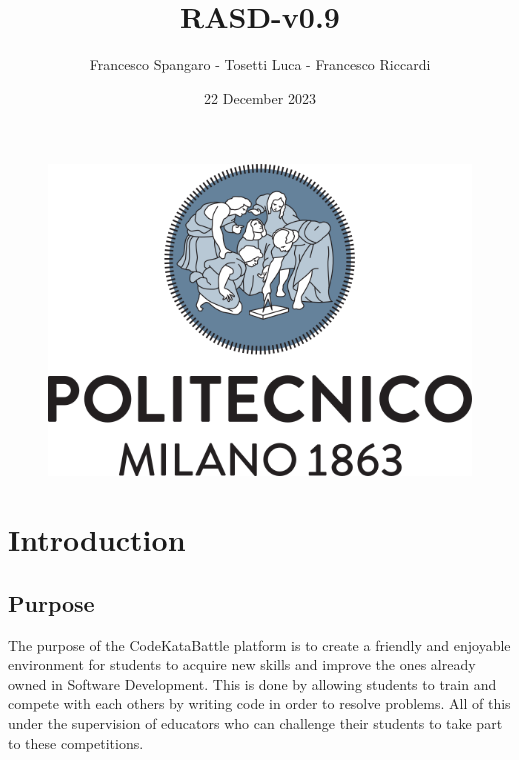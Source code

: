 \documentclass{article}
\title{RASD-v0.9}
\author{Francesco Spangaro - Tosetti Luca - Francesco Riccardi}
\date{22 December 2023}
\begin{document}
\maketitle

\begin{figure}[h]
    \centering
    \includegraphics[scale=0.5]{politecnico-di-milano-logo.png}
\end{figure}



\tableofcontents

\newpage

\pagestyle{IntroductionStyle}

\section{Introduction}
    \subsection{Purpose}
        The purpose of the CodeKataBattle platform is to create a friendly and enjoyable environment for students
        to acquire new skills and improve the ones already owned in Software Development. This is done by allowing students to train and compete with each others by writing code in order to resolve problems. All of this under the supervision of educators who can challenge their students to take part to these competitions.
\end{document}
